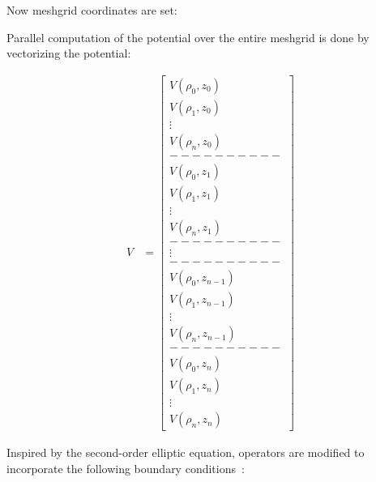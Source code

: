 \newpage
Now meshgrid coordinates are set:



\newpage

Parallel computation of the potential over the entire meshgrid is done by vectorizing the potential:

\[ 
 \begin{aligned}
    V &= \begin{bmatrix}
           V(\rho_0, z_0) \\
           V(\rho_1, z_0) \\
           \vdots \\
	   V(\rho_n, z_0) \\
	   ---------- \\
	   V(\rho_0, z_1) \\
           V(\rho_1, z_1) \\
           \vdots \\
	   V(\rho_n, z_1) \\
	   ---------- \\
	   \vdots \\
	   ---------- \\
	   V(\rho_0, z_{n-1}) \\
           V(\rho_1, z_{n-1}) \\
           \vdots \\
           V(\rho_n, z_{n-1}) \\
           ---------- \\
           V(\rho_0, z_n) \\
	   V(\rho_1, z_n) \\
	   \vdots \\
	   V(\rho_n, z_n) 
         \end{bmatrix}
  \end{aligned}
\]

\newpage
\noindent Inspired by the second-order elliptic equation, operators are modified to incorporate the following boundary conditions~\cite{Press:2007}:

